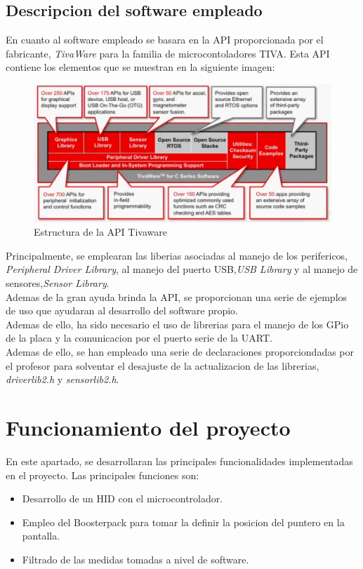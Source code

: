 \documentclass[a4paper,twoside]{article}
\begin{document}
\subsection{Descripcion del software empleado}
En cuanto al software empleado se basara en la API proporcionada por el fabricante, \textit{TivaWare} para la familia de microcontoladores TIVA. Esta API contiene los elementos que se muestran en la siguiente imagen:\\
\begin{figure}[h!]
 \centering
 \includegraphics[width=.8\textwidth]{../images/tivaware_struct}
 \caption{Estructura de la API Tivaware}
\end{figure}

Principalmente, se emplearan las liberias asociadas al manejo de los perifericos, \textit{Peripheral Driver Library}, al manejo del puerto USB,\textit{USB Library} y al manejo de sensores,\textit{Sensor Library}. \\
Ademas de la gran ayuda brinda la API, se proporcionan una serie de ejemplos de uso que ayudaran al desarrollo del software propio. \\

Ademas de ello, ha sido necesario el uso de librerias para el manejo de los GPio de la placa y la comunicacion por el puerto serie de la UART. \\
Ademas de ello, se han empleado una serie de declaraciones proporciondadas por el profesor para solventar el desajuste de la actualizacion de las librerias, \textit{driverlib2.h} y \textit{sensorlib2.h}.

\newpage
\section{Funcionamiento del proyecto}
En este apartado, se desarrollaran las principales funcionalidades implementadas en el proyecto. Las principales funciones son:
\begin{itemize}
\item Desarrollo de un HID con el microcontrolador.
\item Empleo del Boosterpack para tomar la definir la posicion del puntero en la pantalla.
\item Filtrado de las medidas tomadas a nivel de software.
\end{itemize}
\end{document}
